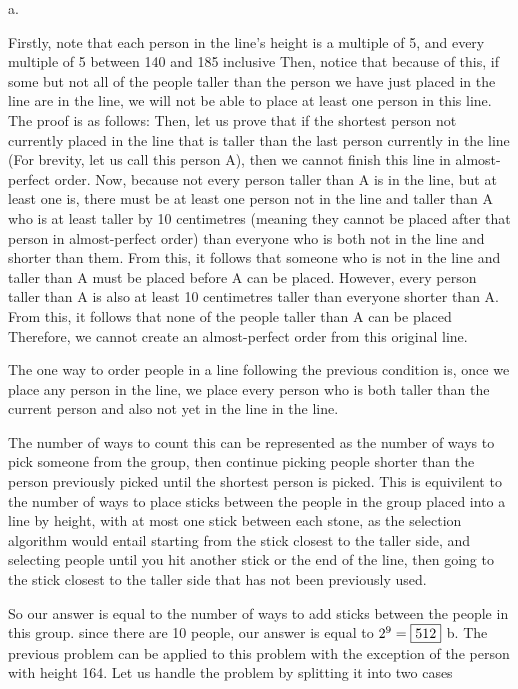 \documentclass[11pt]{article}
\begin{document}
\begin{solution}{3} %
a.

Firstly, note that each person in the line's height is a multiple of 5, and every multiple of 5 between 140 and 185 inclusive
Then, notice that because of this, if some but not all of the people taller than the person we have just placed in the line are in the line, we will not be able to place at least one person in this line.
The proof is as follows:
Then, let us prove that if the shortest person not currently placed in the line that is taller than the last person currently in the line 
(For brevity, let us call this person A), then we cannot finish this line in almost-perfect order.
Now, because not every person taller than A is in the line, but at least one is, there must be at least one person not in the line
and taller than A who is at least taller by 10 centimetres (meaning they cannot be placed after that person in almost-perfect order) than everyone who is both
not in the line and shorter than them. From this, it follows that someone who is not in the line and taller than A must be placed before A can be placed.
However, every person taller than A is also at least 10 centimetres taller than everyone shorter than A. From this, it follows that none of the people taller than A can be placed
Therefore, we cannot create an almost-perfect order from this original line.

The one way to order people in a line following the previous condition is, once we place any person in the line, we place every person who is both taller 
than the current person and also not yet in the line in the line.

The number of ways to count this can be represented as the number of ways to pick someone from the group, then continue picking people shorter than
the person previously picked until the shortest person is picked. This is equivilent to the number of ways to place sticks
between the people in the group placed into a line by height, with at most one stick between each stone, as the selection algorithm would
entail starting from the stick closest to the taller side, and selecting people until you hit another stick or the end of the line, then
going to the stick closest to the taller side that has not been previously used.


So our answer is equal to the number of ways to add sticks between the people in this group. since there are 10 people, our answer is equal to
$2^{9} = \fbox{512}$
b.
The previous problem can be applied to this problem with the exception of the person with height 164. Let us handle the problem
by splitting it into two cases


\end{solution}
\end{document}
